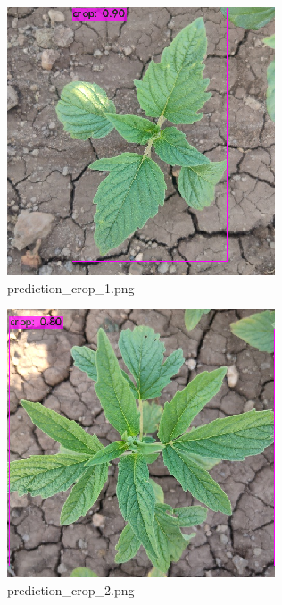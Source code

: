 \documentclass[12pt]{exam}
\begin{document}
\begin{questions}
\begin{parts}
		\begin{figure}[H]
			\includegraphics[width=\textwidth]{images-yolo/prediction_crop_1.png}
			\caption{prediction\_crop\_1.png}
		\end{figure}

		\hfill

		\begin{figure}[H]
			\includegraphics[width=\textwidth]{images-yolo/prediction_crop_2.png}
			\caption{prediction\_crop\_2.png}
		\end{figure}


\end{parts}
\end{questions}
\end{document}
